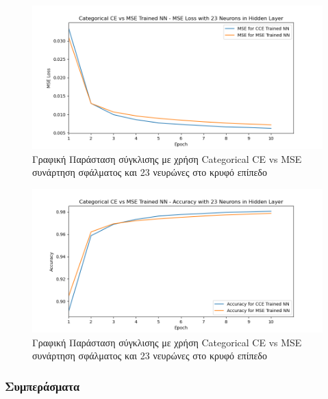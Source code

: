 \documentclass[12pt,a4paper]{article}
\begin{document}
\begin{figure}[H]
	\includegraphics[width=\textwidth]{8. CCE vs MSE - MSE Loss - 23 Neurons.png}
	\caption{Γραφική Παράσταση σύγκλισης με χρήση Categorical CE vs MSE συνάρτηση σφάλματος και 23 νευρώνες στο κρυφό επίπεδο}
\end{figure}

\begin{figure}[H]
	\includegraphics[width=\textwidth]{9. CCE vs MSE - Accuracy - 23 Neurons.png}
	\caption{Γραφική Παράσταση σύγκλισης με χρήση Categorical CE vs MSE συνάρτηση σφάλματος και 23 νευρώνες στο κρυφό επίπεδο}
\end{figure}

\subsubsection{Συμπεράσματα}
\end{document}
